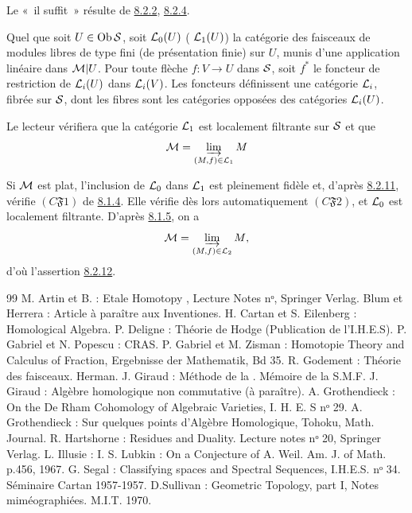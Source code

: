 \documentclass[10pt]{../fichiers-configuration-latex/smfart}
\begin{document}
Le « il suffit » résulte de \hyperref[V.thm8.2.2]{8.2.2}, \hyperref[V.prop8.2.4]{8.2.4}.

Quel que soit $U \in \operatorname{Ob} {\mathcal S}$, soit ${\mathcal L}_0(U)$ (\resp
${\mathcal L}_1(U)$) la catégorie des faisceaux de modules libres de
type fini (\resp de présentation finie) sur $U$, munis d'une
application linéaire dans ${\mathcal M} | U$. Pour toute flèche $f : V \to U$
dans ${\mathcal S}$, soit $f^{\ast}$ le foncteur de restriction de ${\mathcal L}_i(U)$
dans ${\mathcal L}_i(V)$. Les foncteurs définissent une catégorie
${\mathcal L}_i$, fibrée sur ${\mathcal S}$, dont les fibres sont les catégories
opposées des catégories ${\mathcal L}_i(U)$.

Le lecteur vérifiera que la catégorie ${\mathcal L}_1$ est localement
filtrante sur ${\mathcal S}$ et que
$$
{\mathcal M} = \varinjlim_{(M , f) \in {\mathcal L}_1} M
$$

Si ${\mathcal M}$ est plat, l'inclusion de ${\mathcal L}_0$ dans
${\mathcal L}_1$ est pleinement fidèle et, d'après \hyperref[V.lem8.2.11]{8.2.11}, vérifie $(C
\mathfrak{F} 1)$ de \hyperref[V.def8.1.4]{8.1.4}. Elle vérifie dès lors automatiquement
$(C \mathfrak{F} 2)$, et ${\mathcal L}_0$ est localement
filtrante. D'après \hyperref[V.prop8.1.5]{8.1.5}, on a
$$
{\mathcal M} = \varinjlim_{(M, f)\in {\mathcal L}_2} M{},
$$
d'où l'assertion \hyperref[V.thm8.2.12]{8.2.12}.

\begin{thebibliography}{99}\pageoriginale
{} M. Artin et B.  : Etale Homotopy , Lecture Notes nᵒ, Springer Verlag.
 Blum et Herrera : Article à paraître aux Inventiones.
 H. Cartan et S. Eilenberg : Homological Algebra.
 P. Deligne : Théorie de Hodge (Publication de l'I.H.E.S).
 P. Gabriel et N. Popescu : CRAS.
 P. Gabriel et M. Zisman : Homotopie Theory and Calculus of
  Fraction, Ergebnisse der Mathematik, Bd 35.
 R. Godement : Théorie des faisceaux. Herman.
 J. Giraud : Méthode de la . Mémoire de la S.M.F.
 J. Giraud : Algèbre homologique non commutative (à paraître).
 A. Grothendieck : On the De Rham Cohomology of Algebraic
  Varieties, I. H. E. S nᵒ 29.
 A. Grothendieck : Sur quelques points d'Algèbre Homologique,
  Tohoku, Math. Journal.
 R. Hartshorne : Residues and Duality. Lecture notes
  nᵒ 20, Springer Verlag.
 L. Illusie :  I.
 S. Lubkin : On a Conjecture of A. Weil. Am. J. of
  Math. p.456, 1967.
 G. Segal : Classifying spaces and Spectral Sequences,
  I.H.E.S. nᵒ 34.
 Séminaire Cartan 1957-1957.
 D.Sullivan : Geometric Topology, part I, Notes
  miméographiées. M.I.T. 1970.
\end{thebibliography}

\ifx\danslelivre\undefined
\end{document}
